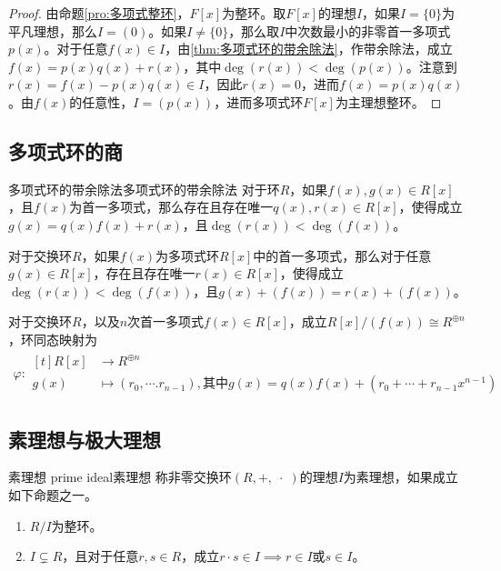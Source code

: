 \begin{proof}
	由命题\ref{pro:多项式整环}，$F[x]$为整环。取$F[x]$的理想$I$，如果$I=\{0\}$为平凡理想，那么$I=(0)$。如果$I\ne\{0\}$，那么取$I$中次数最小的非零首一多项式$p(x)$。对于任意$f(x)\in I$，由\ref{thm:多项式环的带余除法}，作带余除法，成立$f(x)=p(x)q(x)+r(x)$，其中$\deg(r(x))<\deg(p(x))$。注意到$r(x)=f(x)-p(x)q(x)\in I$，因此$r(x)=0$，进而$f(x)=p(x)q(x)$。由$f(x)$的任意性，$I=(p(x))$，进而多项式环$F[x]$为主理想整环。
\end{proof}

\subsection{多项式环的商}

\begin{theorem}{多项式环的带余除法}{多项式环的带余除法}
	对于环$R$，如果$f(x),g(x)\in R[x]$，且$f(x)$为首一多项式，那么存在且存在唯一$q(x),r(x)\in R[x]$，使得成立$g(x)=q(x)f(x)+r(x)$，且$\deg(r(x))<\deg(f(x))$。
\end{theorem}

\begin{proposition}
	对于交换环$R$，如果$f(x)$为多项式环$R[x]$中的首一多项式，那么对于任意$g(x)\in R[x]$，存在且存在唯一$r(x)\in R[x]$，使得成立$\deg(r(x))<\deg(f(x))$，且$g(x)+(f(x))=r(x)+(f(x))$。
\end{proposition}

\begin{proposition}
	对于交换环$R$，以及$n$次首一多项式$f(x)\in R[x]$，成立$R[x]/(f(x))\cong R^{\oplus n}$，环同态映射为
	\begin{align*}
		\varphi:\begin{aligned}[t]
			R[x]&\longrightarrow R^{\oplus n}\\
			g(x)&\longmapsto (r_0,\cdots.r_{n-1}),\text{其中}g(x)=q(x)f(x)+(r_0+\cdots+r_{n-1}x^{n-1})
		\end{aligned}
	\end{align*}
\end{proposition}

\subsection{素理想与极大理想}

\begin{definition}{素理想 prime ideal}{素理想}
	称非零交换环$(R,+,\;\cdot\;)$的理想$I$为素理想，如果成立如下命题之一。
	\begin{enumerate}
		\item $R/I$为整环。
		\item $I\subsetneq R$，且对于任意$r,s\in R$，成立$r\cdot s\in I\implies r\in I\text{或}s\in I$。
	\end{enumerate}
\end{definition}

